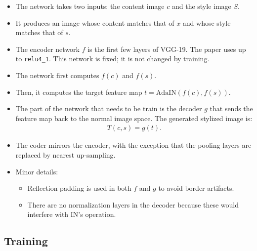 \documentclass[10pt]{article}
\begin{document}
  \begin{itemize}
  	\item The network takes two inputs: the content image $c$ and the style image $S$.

  	\item It produces an image whose content matches that of $x$ and whose style matches that of $s$.

  	\item The encoder network $f$ is the first few layers of VGG-19. The paper uses up to \texttt{relu4\_1}. This network is fixed; it is not changed by training.

  	\item The network first computes $f(c)$ and $f(s)$.

  	\item Then, it computes the target feature map $t = \mathrm{AdaIN}(f(c), f(s))$.

  	\item The part of the network that needs to be train is the decoder $g$ that sends the feature map back to the normal image space. The generated stylized image is:
  	\begin{align*}
  		T(c,s) = g(t).
  	\end{align*}

  	\item The coder mirrors the encoder, with the exception that the pooling layers are replaced by nearest up-sampling.

  	\item Minor details:
  	\begin{itemize}
  		\item Reflection padding is used in both $f$ and $g$ to avoid border artifacts.

  		\item There are no normalization layers in the decoder because these would interfere with IN's operation.
  	\end{itemize}
  \end{itemize}

  \subsection{Training}
\end{document}
